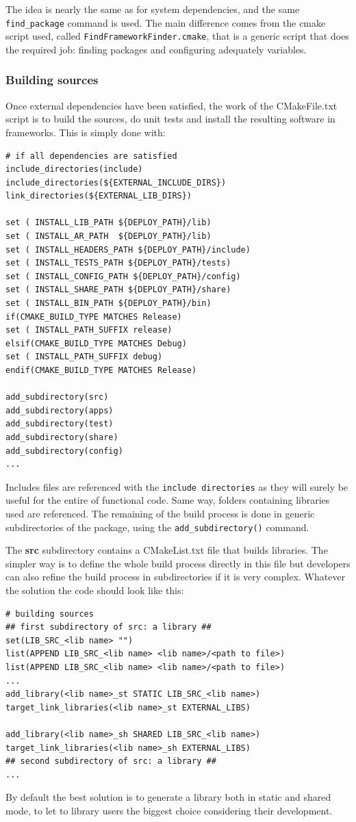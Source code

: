 \documentclass[12pt,a4paper]{article}
\begin{document}
The idea is nearly the same as for system dependencies, and the same \verb|find_package| command is used. The main difference comes from the cmake script used, called \texttt{FindFrameworkFinder.cmake}, that is a generic script that does the required job: finding packages and configuring adequately variables. 

\subsubsection{Building sources}

Once external dependencies have been satisfied, the work of the CMakeFile.txt script is to build the sources, do unit tests and install the resulting software in frameworks. This is simply done with:
\begin{verbatim}
# if all dependencies are satisfied
include_directories(include)
include_directories(${EXTERNAL_INCLUDE_DIRS})
link_directories(${EXTERNAL_LIB_DIRS})

set ( INSTALL_LIB_PATH ${DEPLOY_PATH}/lib)
set ( INSTALL_AR_PATH  ${DEPLOY_PATH}/lib)
set ( INSTALL_HEADERS_PATH ${DEPLOY_PATH}/include)
set ( INSTALL_TESTS_PATH ${DEPLOY_PATH}/tests)
set ( INSTALL_CONFIG_PATH ${DEPLOY_PATH}/config)
set ( INSTALL_SHARE_PATH ${DEPLOY_PATH}/share)
set ( INSTALL_BIN_PATH ${DEPLOY_PATH}/bin)
if(CMAKE_BUILD_TYPE MATCHES Release)
set ( INSTALL_PATH_SUFFIX release)
elsif(CMAKE_BUILD_TYPE MATCHES Debug)
set ( INSTALL_PATH_SUFFIX debug)
endif(CMAKE_BUILD_TYPE MATCHES Release)

add_subdirectory(src)
add_subdirectory(apps)
add_subdirectory(test)
add_subdirectory(share)
add_subdirectory(config)
...
\end{verbatim}

Includes files are referenced with the \texttt{include directories} as they will surely be useful for the entire of functional code. Same way, folders containing libraries used are referenced. The remaining of the build process is done in generic subdirectories of the package, using the \texttt{add\_subdirectory()} command.

The \textbf{src} subdirectory contains a CMakeList.txt file that builds libraries. The simpler way is to define the whole build process directly in this file but developers can also refine the build process in subdirectories if it is very complex. Whatever the solution the code should look like this:
\begin{verbatim}
# building sources
## first subdirectory of src: a library ##
set(LIB_SRC_<lib name> "")
list(APPEND LIB_SRC_<lib name> <lib name>/<path to file>)
list(APPEND LIB_SRC_<lib name> <lib name>/<path to file>)
...
add_library(<lib name>_st STATIC LIB_SRC_<lib name>)
target_link_libraries(<lib name>_st EXTERNAL_LIBS)

add_library(<lib name>_sh SHARED LIB_SRC_<lib name>)
target_link_libraries(<lib name>_sh EXTERNAL_LIBS)
## second subdirectory of src: a library ##
...
\end{verbatim}
By default the best solution is to generate a library both in static and shared mode, to let to library users the biggest choice considering their development.
\end{document}

